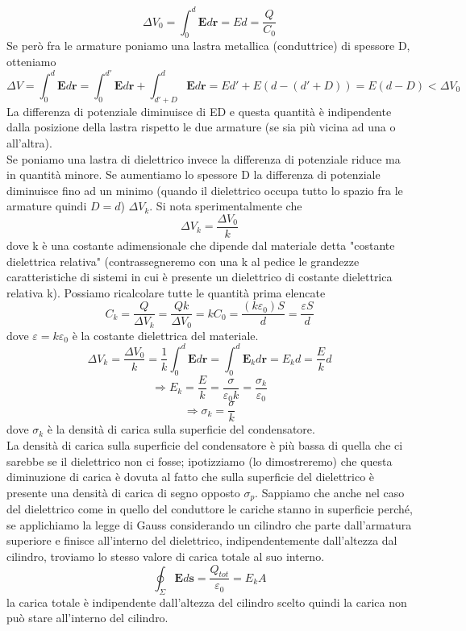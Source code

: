 \documentclass[10pt,a4paper]{article}
\begin{document}
\[\Delta V_0 = \int_{0}^{d}\mathbf{E}d\mathbf{r} = Ed = \frac{Q}{C_0}\]
Se però fra le armature poniamo una lastra metallica (conduttrice) di spessore D, otteniamo
\[\Delta V = \int_{0}^{d}\mathbf{E}d\mathbf{r} = \int_{0}^{d'}\mathbf{E}d\mathbf{r} + \int_{d'+D}^{d}\mathbf{E}d\mathbf{r} = Ed' + E(d-(d'+D)) = E(d-D) < \Delta V_0 \]
La differenza di potenziale diminuisce di ED e questa quantità è indipendente dalla posizione della lastra rispetto le due armature (se sia più vicina ad una o all'altra).\\
Se poniamo una lastra di dielettrico invece la differenza di potenziale riduce ma in quantità minore. Se aumentiamo lo spessore D la differenza di potenziale diminuisce fino ad un minimo (quando il dielettrico occupa tutto lo spazio fra le armature quindi \(D = d\)) $\Delta V_k$. Si nota sperimentalmente che 
\[\Delta V_k = \frac{\Delta V_0}{k}\]
dove k è una costante adimensionale che dipende dal materiale detta "costante dielettrica relativa" (contrassegneremo con una k al pedice le grandezze caratteristiche di sistemi in cui è presente un dielettrico di costante dielettrica relativa k). Possiamo ricalcolare tutte le quantità prima elencate
\[C_k = \frac{Q}{\Delta V_k} = \frac{Qk}{\Delta V_0} = kC_0 = \frac{(k\varepsilon_0)S}{d} = \frac{\varepsilon S}{d}\]
dove $\varepsilon = k\varepsilon_0$ è la costante dielettrica del materiale. 
\[\Delta V_k = \frac{\Delta V_0}{k} = \frac{1}{k}\int_{0}^{d}\mathbf{E}d\mathbf{r} = \int_{0}^{d}\mathbf{E}_kd\mathbf{r} = E_kd = \frac{E}{k}d \]
\[\Rightarrow E_k = \frac{E}{k}= \frac{\sigma}{\varepsilon_0 k} = \frac{\sigma_k}{\varepsilon_0}\]
\[\Rightarrow \sigma_k = \frac{\sigma}{k}\]
dove $\sigma_k$ è la densità di carica sulla superficie del condensatore.\\
La densità di carica sulla superficie del condensatore è più bassa di quella che ci sarebbe se il dielettrico non ci fosse; ipotizziamo (lo dimostreremo) che questa diminuzione di carica è dovuta al fatto che sulla superficie del dielettrico è presente una densità di carica di segno opposto \(\sigma_p\). Sappiamo che anche nel caso del dielettrico come in quello del conduttore le cariche stanno in superficie perché, se applichiamo la legge di Gauss considerando un cilindro che parte dall'armatura superiore e finisce all'interno del dielettrico, indipendentemente dall'altezza dal cilindro, troviamo lo stesso valore di carica totale al suo interno.
\[\oint_\Sigma \mathbf{E}d\mathbf{s} = \frac{Q_{tot}}{\varepsilon_0} = E_k A \]
la carica totale è indipendente dall'altezza del cilindro scelto quindi la carica non può stare all'interno del cilindro.\\
\end{document}
